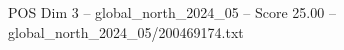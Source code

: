 \begin{textsample}{POS Dim 3 – global\_north\_2024\_05 – Score 25.00 – global\_north\_2024\_05/200469174.txt}
\end{textsample}
